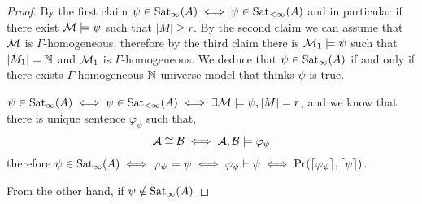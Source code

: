 \begin{proof}
	By the first claim $\psi \in \operatorname{Sat}_{\infty}(A) \iff \psi \in \operatorname{Sat}_{< \infty}(A)$ and in particular if there exist $\mathcal{M} \models \psi$ such that $|M| \ge r$.
	By the second claim we can assume that $\mathcal{M}$ is $\Gamma$-homogeneous, therefore by the third claim there is $\mathcal{M}_1 \models \psi$ such that $|M_1| = \mathbb{N}$ and $\mathcal{M}_1$ is $\Gamma$-homogeneous.
	We deduce that $\psi \in \operatorname{Sat}_{\infty}(A)$ if and only if there exists $\Gamma$-homogeneous $\mathbb{N}$-universe model that thinks $\psi$ is true.

	$\psi \in \operatorname{Sat}_{\infty}(A) \iff \psi \in \operatorname{Sat}_{< \infty}(A) \iff \exists \mathcal{M} \models \psi, |M| = r$, and we know that there is unique sentence $\varphi_{\psi}$ such that,
	\[
		\mathcal{A} \cong \mathcal{B}
		\iff \mathcal{A}, \mathcal{B} \models \varphi_{\psi}
	\]
	therefore $\psi \in \operatorname{Sat}_{\infty}(A) \iff \varphi_{\psi} \models \psi \iff \varphi_{\psi} \vdash \psi \iff \operatorname{Pr}(\lceil \varphi_{\psi} \rceil, \lceil \psi \rceil)$.

	From the other hand, if $\psi \notin \operatorname{Sat}_{\infty}(A)$
\end{proof}


